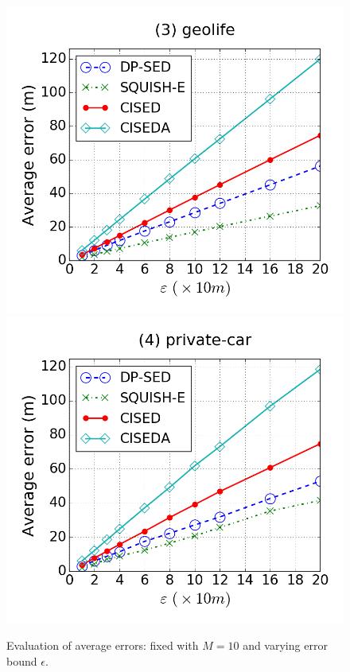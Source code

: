 {\begin{figure}[tb]
\includegraphics[scale = 0.250]{figures/Exp-error-epsilon-geolife.png}
\includegraphics[scale = 0.250]{figures/Exp-error-epsilon-private.png}
\vspace{-2ex}
\caption{\small Evaluation of average errors: fixed with $M=10$ and varying error bound $\epsilon$.}
\label{fig:ae-m10}
\vspace{-2ex}
\end{figure}
}



